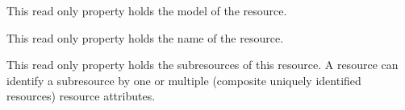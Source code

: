 \documentclass[letterpaper,10pt,english]{sphinxmanual}
\begin{document}
\begin{fulllineitems}
\begin{fulllineitems}
\label{features/roa/technical_summary:fantastico.roa.resource_decorator.Resource.model}
This read only property holds the model of the resource.

\end{fulllineitems}


\begin{fulllineitems}
\label{features/roa/technical_summary:fantastico.roa.resource_decorator.Resource.name}
This read only property holds the name of the resource.

\end{fulllineitems}


\begin{fulllineitems}
\label{features/roa/technical_summary:fantastico.roa.resource_decorator.Resource.subresources}
This read only property holds the subresources of this resource. A resource can identify a subresource by one
or multiple (composite uniquely identified resources) resource attributes.


\end{fulllineitems}
\end{fulllineitems}
\end{document}
